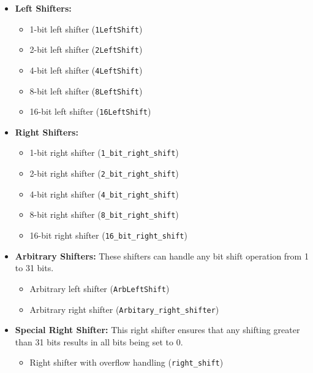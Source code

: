 \documentclass{article}
\begin{document}
\begin{itemize}
    \item \textbf{Left Shifters:} 
    \begin{itemize}
        \item 1-bit left shifter (\texttt{1LeftShift})
        \item 2-bit left shifter (\texttt{2LeftShift})
        \item 4-bit left shifter (\texttt{4LeftShift})
        \item 8-bit left shifter (\texttt{8LeftShift})
        \item 16-bit left shifter (\texttt{16LeftShift})
    \end{itemize}
    
    \item \textbf{Right Shifters:} 
    \begin{itemize}
    \item 1-bit right shifter (\texttt{1\_bit\_right\_shift})
    \item 2-bit right shifter (\texttt{2\_bit\_right\_shift})
    \item 4-bit right shifter (\texttt{4\_bit\_right\_shift})
    \item 8-bit right shifter (\texttt{8\_bit\_right\_shift})
    \item 16-bit right shifter (\texttt{16\_bit\_right\_shift})
\end{itemize}


    \item \textbf{Arbitrary Shifters:} 
    These shifters can handle any bit shift operation from 1 to 31 bits.
    \begin{itemize}
        \item Arbitrary left shifter (\texttt{ArbLeftShift})
        \item Arbitrary right shifter (\texttt{Arbitary\_right\_shifter})
    \end{itemize}
    
    \item \textbf{Special Right Shifter:} 
    This right shifter ensures that any shifting greater than 31 bits results in all bits being set to 0.
    \begin{itemize}
        \item Right shifter with overflow handling (\texttt{right\_shift})
    \end{itemize}
\end{itemize}
\end{document}
